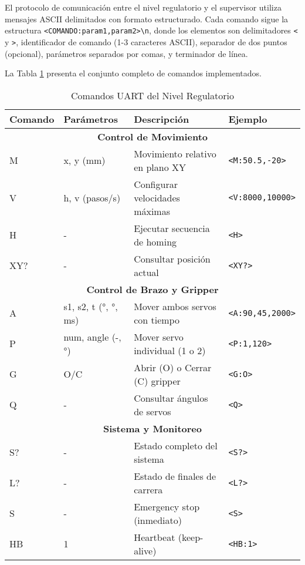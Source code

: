 El protocolo de comunicación entre el nivel regulatorio y el supervisor utiliza mensajes ASCII delimitados con formato estructurado. Cada comando sigue la estructura \texttt{<COMANDO:param1,param2>\textbackslash n}, donde los elementos son delimitadores \texttt{<} y \texttt{>}, identificador de comando (1-3 caracteres ASCII), separador de dos puntos (opcional), parámetros separados por comas, y terminador de línea.

La Tabla \ref{tab:comandos_uart} presenta el conjunto completo de comandos implementados.

\begin{table}[H]
\centering
\small
\begin{tabular}{|l|l|p{4.5cm}|l|}
\hline
\textbf{Comando} & \textbf{Parámetros} & \textbf{Descripción} & \textbf{Ejemplo} \\
\hline
\multicolumn{4}{|c|}{\textbf{Control de Movimiento}} \\
\hline
M & x, y (mm) & Movimiento relativo en plano XY & \texttt{<M:50.5,-20>} \\
\hline
V & h, v (pasos/s) & Configurar velocidades máximas & \texttt{<V:8000,10000>} \\
\hline
H & - & Ejecutar secuencia de homing & \texttt{<H>} \\
\hline
XY? & - & Consultar posición actual & \texttt{<XY?>} \\
\hline
\multicolumn{4}{|c|}{\textbf{Control de Brazo y Gripper}} \\
\hline
A & s1, s2, t (°, °, ms) & Mover ambos servos con tiempo & \texttt{<A:90,45,2000>} \\
\hline
P & num, angle (-, °) & Mover servo individual (1 o 2) & \texttt{<P:1,120>} \\
\hline
G & O/C & Abrir (O) o Cerrar (C) gripper & \texttt{<G:O>} \\
\hline
Q & - & Consultar ángulos de servos & \texttt{<Q>} \\
\hline
\multicolumn{4}{|c|}{\textbf{Sistema y Monitoreo}} \\
\hline
S? & - & Estado completo del sistema & \texttt{<S?>} \\
\hline
L? & - & Estado de finales de carrera & \texttt{<L?>} \\
\hline
S & - & Emergency stop (inmediato) & \texttt{<S>} \\
\hline
HB & 1 & Heartbeat (keep-alive) & \texttt{<HB:1>} \\
\hline
\end{tabular}
\caption{Comandos UART del Nivel Regulatorio}
\label{tab:comandos_uart}
\end{table}

